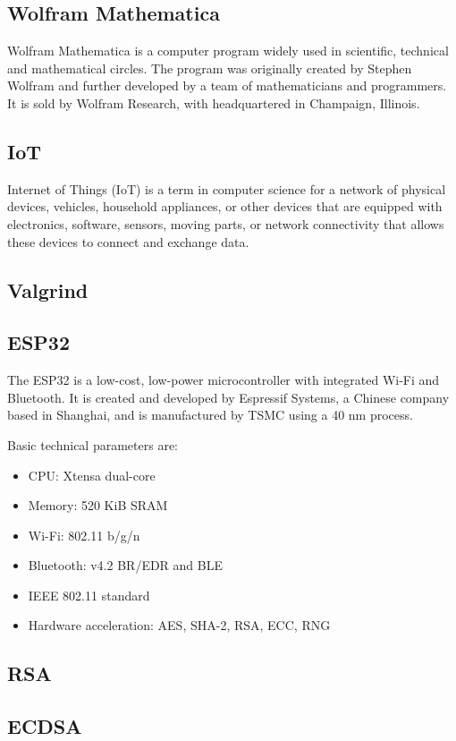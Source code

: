 \documentclass[thesis=M,english]{FITthesis}[2019/12/23]
\begin{document}
\subsection{Wolfram Mathematica}
Wolfram Mathematica is a computer program widely used in scientific, technical and mathematical circles. The program was originally created by Stephen Wolfram and further developed by a team of mathematicians and programmers. It is sold by Wolfram Research, with headquartered in Champaign, Illinois.

\subsection{IoT}
Internet of Things (IoT) is a term in computer science for a network of physical devices, vehicles, household appliances, or other devices that are equipped with electronics, software, sensors, moving parts, or network connectivity that allows these devices to connect and exchange data.

\subsection{Valgrind}

\subsection{ESP32}
The ESP32 is a low-cost, low-power microcontroller with integrated Wi-Fi and Bluetooth. It is created and developed by Espressif Systems, a Chinese company based in Shanghai, and is manufactured by TSMC using a 40 nm process.

\bigskip
\noindent
Basic technical parameters are:
\begin{itemize}
\item	CPU: Xtensa dual-core
\item	Memory: 520 KiB SRAM
\item	Wi-Fi: 802.11 b/g/n
\item	Bluetooth: v4.2 BR/EDR and BLE
\item	IEEE 802.11 standard
\item	Hardware acceleration: AES, SHA-2, RSA, ECC, RNG
\end{itemize}

\subsection{RSA}
\subsection{ECDSA}
\end{document}
